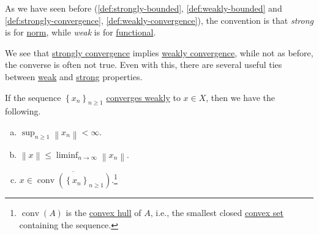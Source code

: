 \begin{remark}
	As we have seen before (\autoref{def:strongly-bounded}, \autoref{def:weakly-bounded} and \autoref{def:strongly-convergence}, \autoref{def:weakly-convergence}), the convention is that \emph{strong} is for \hyperref[def:norm]{norm}, while \emph{weak} is for \hyperref[def:linear-functional]{functional}.
\end{remark}

We see that \hyperref[def:strongly-convergence]{strongly convergence} implies \hyperref[def:weakly-convergence]{weakly convergence}, while not as before, the converse is often not true. Even with this, there are several useful ties between \hyperref[def:weakly-convergence]{weak} and \hyperref[def:strongly-convergence]{strong} properties.

\begin{proposition}\label{prop:lec16}
	If the sequence \(\left\{ x_n \right\} _{n\geq 1}\) \hyperref[def:weakly-convergence]{converges weakly} to \(x\in X\), then we have the following.
	\begin{enumerate}[(a)]
		\item \(\sup _{n \geq 1} \left\lVert x_n\right\rVert < \infty \).
		\item \(\left\lVert x\right\rVert \leq \liminf_{n \to \infty} \left\lVert x_n\right\rVert \).
		\item \(x\in \overline{\mathop{\mathrm{conv}}(\left\{ x_n \right\}_{n\geq 1})}\).\footnote{\(\mathop{\mathrm{conv}}(A)\) is the \href{https://en.wikipedia.org/wiki/Convex_hull}{convex hull} of \(A\), i.e., the smallest closed \hyperref[def:convex-set]{convex set} containing the sequence.}
	\end{enumerate}
\end{proposition}
